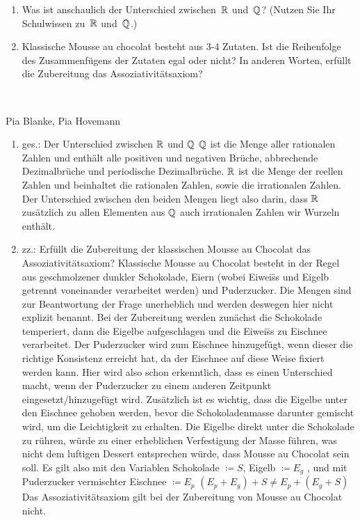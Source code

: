 \bigskip


\begin{aufg}[4 Punkte]
\begin{enumerate}[label=$\mathrm{(\roman*)}$, ref=$\mathrm{\roman*}$]
\item Was ist anschaulich der Unterschied zwischen~$\mathbb{R}$ und~$\mathbb{Q}$? (Nutzen Sie Ihr Schulwissen zu~$\mathbb{R}$ und~$\mathbb{Q}$.)
\item Klassische Mousse au chocolat besteht aus 3-4 Zutaten. Ist die Reihenfolge des Zusammenf\"ugens der Zutaten egal oder nicht? In anderen Worten, erf\"ullt die Zubereitung das Assoziativit\"atsaxiom?
\end{enumerate}
\end{aufg}
 
\bigskip

\begin{lsg}\mbox{ }
\item [Pia Blanke, Pia Hovemann]
\begin{enumerate}[label=$\mathrm{(\roman*)}$, ref=$\mathrm{\roman*}$]
\item ges.: Der Unterschied zwischen $\mathbb{R}$ und $\mathbb{Q}$ 
$\mathbb{Q}$  ist die Menge aller rationalen Zahlen und enth\"alt alle positiven und negativen Br\"uche, abbrechende Dezimalbr\"uche und periodische Dezimalbr\"uche.
$\mathbb{R}$ ist die Menge der reellen Zahlen und beinhaltet die rationalen Zahlen, sowie die irrationalen Zahlen.
Der Unterschied zwischen den beiden Mengen liegt also darin, dass $\mathbb{R}$ zus\"atzlich zu allen Elementen aus $\mathbb{Q}$  auch irrationalen Zahlen wir Wurzeln enth\"alt.
%
\item zz.: Erf\"ullt die Zubereitung der klassischen Mousse au Chocolat das Assoziativit\"atsaxiom?
Klassische Mousse au Chocolat besteht in der Regel aus geschmolzener dunkler Schokolade, Eiern (wobei Eiwei{\"ss} und Eigelb getrennt voneinander verarbeitet werden) und Puderzucker. Die Mengen sind zur Beantwortung der Frage unerheblich und werden deswegen hier nicht explizit benannt.
Bei der Zubereitung werden zun\"achst die Schokolade temperiert, dann die Eigelbe aufgeschlagen und die Eiwei{\"ss} zu Eischnee verarbeitet. Der Puderzucker wird zum Eischnee hinzugef\"ugt, wenn dieser die richtige Konsistenz erreicht hat, da der Eischnee auf diese Weise fixiert werden kann. Hier wird also schon erkenntlich, dass es einen Unterschied macht, wenn der Puderzucker zu einem anderen Zeitpunkt eingesetzt/hinzugef\"ugt wird. 
Zus\"atzlich ist es wichtig, dass die Eigelbe unter den Eischnee gehoben werden, bevor die Schokoladenmasse darunter gemischt wird, um die Leichtigkeit zu erhalten. Die Eigelbe direkt unter die Schokolade zu r\"uhren, w\"urde zu einer erheblichen Verfestigung der Masse f\"uhren, was nicht dem luftigen Dessert entsprechen w\"urde, dass Mousse au Chocolat sein soll.
Es gilt also mit den Variablen Schokolade $\coloneqq S$, Eigelb $\coloneqq E_{g}$ , und mit Puderzucker vermischter Eischnee $\coloneqq E_{p}$
$(E_{p} + E_{g}) + S \neq E_{p} + (E_{g} + S)$
Das Assoziativit\"atsaxiom gilt bei der Zubereitung von Mousse au Chocolat nicht.
\end{enumerate}
\end{lsg}
